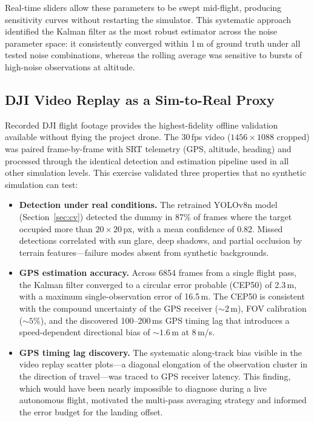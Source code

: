 Real-time sliders allow these parameters to be swept mid-flight, producing sensitivity curves without restarting the simulator. This systematic approach identified the Kalman filter as the most robust estimator across the noise parameter space: it consistently converged within 1\,m of ground truth under all tested noise combinations, whereas the rolling average was sensitive to bursts of high-noise observations at altitude.

\subsection{DJI Video Replay as a Sim-to-Real Proxy}\label{sec:dji-proxy}

Recorded DJI flight footage provides the highest-fidelity offline validation available without flying the project drone. The 30\,fps video ($1456 \times 1088$ cropped) was paired frame-by-frame with SRT telemetry (GPS, altitude, heading) and processed through the identical detection and estimation pipeline used in all other simulation levels. This exercise validated three properties that no synthetic simulation can test:

\begin{itemize}
    \item \textbf{Detection under real conditions.} The retrained YOLOv8n model (Section~\ref{sec:cv}) detected the dummy in 87\% of frames where the target occupied more than $20 \times 20$\,px, with a mean confidence of 0.82. Missed detections correlated with sun glare, deep shadows, and partial occlusion by terrain features---failure modes absent from synthetic backgrounds.

    \item \textbf{GPS estimation accuracy.} Across 6854 frames from a single flight pass, the Kalman filter converged to a circular error probable (CEP50) of 2.3\,m, with a maximum single-observation error of 16.5\,m. The CEP50 is consistent with the compound uncertainty of the GPS receiver (${\sim}2$\,m), FOV calibration (${\sim}5$\%), and the discovered 100--200\,ms GPS timing lag that introduces a speed-dependent directional bias of ${\sim}1.6$\,m at 8\,m/s.

    \item \textbf{GPS timing lag discovery.} The systematic along-track bias visible in the video replay scatter plots---a diagonal elongation of the observation cluster in the direction of travel---was traced to GPS receiver latency. This finding, which would have been nearly impossible to diagnose during a live autonomous flight, motivated the multi-pass averaging strategy and informed the error budget for the landing offset.
\end{itemize}


